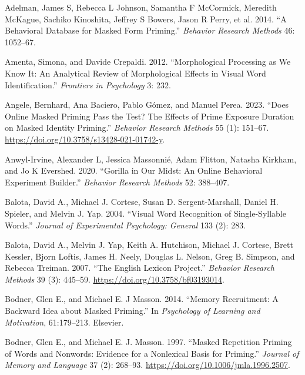 \documentclass[
]{interact}
\newlength{\cslhangindent}
\newenvironment{CSLReferences}[2] %
 {\begin{list}{}{%
  \setlength{\itemindent}{0pt}
  \setlength{\leftmargin}{0pt}
  \setlength{\parsep}{0pt}
  \ifodd #1
   \setlength{\leftmargin}{\cslhangindent}
   \setlength{\itemindent}{-1\cslhangindent}
  \fi
  \setlength{\itemsep}{#2\baselineskip}}}
 {\end{list}}
\begin{document}
\label{refs}
\begin{CSLReferences}{1}{0}
Adelman, James S, Rebecca L Johnson, Samantha F McCormick, Meredith
McKague, Sachiko Kinoshita, Jeffrey S Bowers, Jason R Perry, et al.
2014. {``A Behavioral Database for Masked Form Priming.''}
\emph{Behavior Research Methods} 46: 1052--67.

Amenta, Simona, and Davide Crepaldi. 2012. {``Morphological Processing
as We Know It: An Analytical Review of Morphological Effects in Visual
Word Identification.''} \emph{Frontiers in Psychology} 3: 232.

Angele, Bernhard, Ana Baciero, Pablo Gómez, and Manuel Perea. 2023.
{``Does Online Masked Priming Pass the Test? The Effects of Prime
Exposure Duration on Masked Identity Priming.''} \emph{Behavior Research
Methods} 55 (1): 151--67.
\url{https://doi.org/10.3758/s13428-021-01742-y}.

Anwyl-Irvine, Alexander L, Jessica Massonnié, Adam Flitton, Natasha
Kirkham, and Jo K Evershed. 2020. {``Gorilla in Our Midst: An Online
Behavioral Experiment Builder.''} \emph{Behavior Research Methods} 52:
388--407.

Balota, David A., Michael J. Cortese, Susan D. Sergent-Marshall, Daniel
H. Spieler, and Melvin J. Yap. 2004. {``Visual Word Recognition of
Single-Syllable Words.''} \emph{Journal of Experimental Psychology:
General} 133 (2): 283.

Balota, David A., Melvin J. Yap, Keith A. Hutchison, Michael J. Cortese,
Brett Kessler, Bjorn Loftis, James H. Neely, Douglas L. Nelson, Greg B.
Simpson, and Rebecca Treiman. 2007. {``The English Lexicon Project.''}
\emph{Behavior Research Methods} 39 (3): 445--59.
\url{https://doi.org/10.3758/bf03193014}.

Bodner, Glen E., and Michael E. J Masson. 2014. {``Memory Recruitment: A
Backward Idea about Masked Priming.''} In \emph{Psychology of Learning
and Motivation}, 61:179--213. Elsevier.

Bodner, Glen E., and Michael E. J. Masson. 1997. {``Masked Repetition
Priming of Words and Nonwords: Evidence for a Nonlexical Basis for
Priming.''} \emph{Journal of Memory and Language} 37 (2): 268--93.
\url{https://doi.org/10.1006/jmla.1996.2507}.


\end{CSLReferences}
\end{document}
